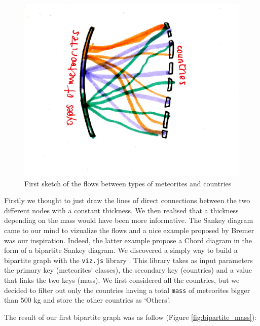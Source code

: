 \documentclass[10pt,conference,compsocconf]{IEEEtran}
\begin{document}
\begin{figure}[]
  \centering
  \includegraphics[width=\columnwidth]{images/bipartite}
  \vspace{-3mm}
  \caption{First sketch of the flows between types of meteorites and countries}
  \label{fig:bipartitesketch}
\end{figure}

Firstly we thought to just draw the lines of direct connections between the two different nodes with a constant thickness. We then realised that a thickness depending on the mass would have been more informative. The Sankey diagram came to our mind to vizualize the flows and a nice example proposed by Bremer \cite{BibEntry2017Dec} was our inspiration. Indeed, the latter example propose a Chord diagram in the form of a bipartite Sankey diagram. We discovered a simply way to build a bipartite graph with the \texttt{viz.js} library \cite{bipartite_viz}. This library takes as input parameters the primary key (meteorites' classes), the secondary key (countries) and a value that links the two keys (mass). We first considered all the countries, but we decided to filter out only the countries having a total \texttt{mass} of meteorites bigger than $500$ kg and store the other countries as `Others'.


The result of our first bipartite graph was as follow (Figure \ref{fig:bipartite_mass}):
\end{document}
